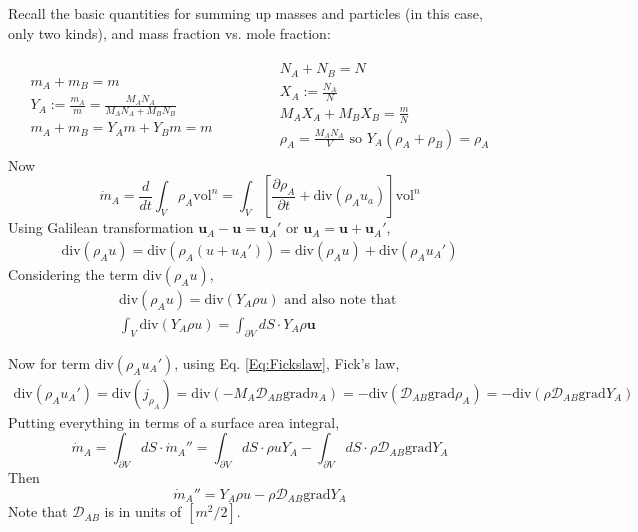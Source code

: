 \documentclass[10pt]{amsart}
\begin{document}
\begin{multicols*}{2}
Recall the basic quantities for summing up masses and particles (in this case, only two kinds), and mass fraction vs. mole fraction:

\[
\begin{gathered}
  \begin{gathered}
  m_A + m_B = m \\
  Y_A := \frac{m_A}{m} = \frac{M_A N_A}{ M_A N_A + M_B N_B} \\ 
  m_A + m_B = Y_Am + Y_Bm = m
\end{gathered} \qquad \qquad \begin{gathered}
    N_A + N_B = N \\
    X_A:= \frac{N_A}{N} \\
    M_A X_A + M_BX_B = \frac{m}{N} \\
    \rho_A =\frac{M_A N_A}{V} \text{ so } Y_A(\rho_A + \rho_B) = \rho_A
\end{gathered}
\end{gathered}
\]
Now
\[
\dot{m}_A = \frac{d}{dt} \int_V \rho_A \text{vol}^n = \int_V \left[ \frac{ \partial \rho_A}{\partial t} + \text{div}(\rho_A u_a)  \right] \text{vol}^n
\]
Using Galilean transformation $\mathbf{u}_A - \mathbf{u} = \mathbf{u}_A'$ or $\mathbf{u}_A = \mathbf{u} + \mathbf{u}_A'$, 
\[
\begin{gathered}
  \text{div}(\rho_A u ) = \text{div}(\rho_A(u+u_A')) = \text{div}(\rho_A u) + \text{div}(\rho_A u_A')  
\end{gathered}
\]
Considering the term $\text{div}(\rho_A u)$, 
\[
\begin{gathered}
  \text{div}(\rho_Au) = \text{div}(Y_A\rho u) \text{ and also note that } \\
  \int_V \text{div}( Y_A \rho u) = \int_{\partial V} dS\cdot Y_A \rho \mathbf{u}
\end{gathered}
\]

Now for term $\text{div}(\rho_Au_A')$, using Eq. \ref{Eq:Fickslaw}, Fick's law, 
\[
\begin{gathered}
  \text{div}(\rho_A u_A') = \text{div}(j_{\rho_A}) = \text{div}( -M_A \mathcal{D}_{AB} \text{grad}n_A ) = -\text{div}(\mathcal{D}_{AB} \text{grad}\rho_A) = -\text{div}(\rho \mathcal{D}_{AB} \text{grad}Y_A)
\end{gathered}
\]
Putting everything in terms of a surface area integral,
\[
\dot{m}_A = \int_{\partial V} dS \cdot \dot{m}_A'' = \int_{\partial V} dS\cdot \rho uY_A - \int_{\partial V} dS \cdot \rho \mathcal{D}_{AB} \text{grad}Y_A
\]
Then
\begin{equation}
\boxed{   \dot{m}_A '' = Y_A \rho u -\rho \mathcal{D}_{AB} \text{grad}Y_A }
\end{equation}
Note that $\mathcal{D}_{AB}$ is in units of $[m^2/2]$.  


\end{multicols*}
\end{document}

